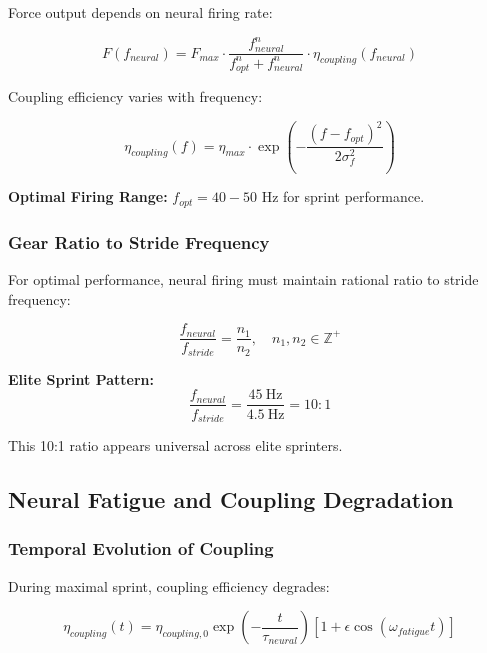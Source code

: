 Force output depends on neural firing rate:

\begin{equation}
F(f_{neural}) = F_{max} \cdot \frac{f_{neural}^n}{f_{opt}^n + f_{neural}^n} \cdot \eta_{coupling}(f_{neural})
\label{eq:frequency_force}
\end{equation}

Coupling efficiency varies with frequency:

\begin{equation}
\eta_{coupling}(f) = \eta_{max} \cdot \exp\left(-\frac{(f - f_{opt})^2}{2\sigma_f^2}\right)
\label{eq:coupling_frequency_dependence}
\end{equation}

\textbf{Optimal Firing Range:} $f_{opt} = 40-50$ Hz for sprint performance.

\subsubsection{Gear Ratio to Stride Frequency}

For optimal performance, neural firing must maintain rational ratio to stride frequency:

\begin{equation}
\frac{f_{neural}}{f_{stride}} = \frac{n_1}{n_2}, \quad n_1, n_2 \in \mathbb{Z}^+
\label{eq:neural_stride_ratio}
\end{equation}

\textbf{Elite Sprint Pattern:}
\begin{equation}
\frac{f_{neural}}{f_{stride}} = \frac{45~\text{Hz}}{4.5~\text{Hz}} = 10:1
\label{eq:optimal_gear_ratio}
\end{equation}

This 10:1 ratio appears universal across elite sprinters.

\subsection{Neural Fatigue and Coupling Degradation}

\subsubsection{Temporal Evolution of Coupling}

During maximal sprint, coupling efficiency degrades:

\begin{equation}
\eta_{coupling}(t) = \eta_{coupling,0} \exp\left(-\frac{t}{\tau_{neural}}\right) \left[1 + \epsilon \cos(\omega_{fatigue} t)\right]
\label{eq:coupling_decay}
\end{equation}

